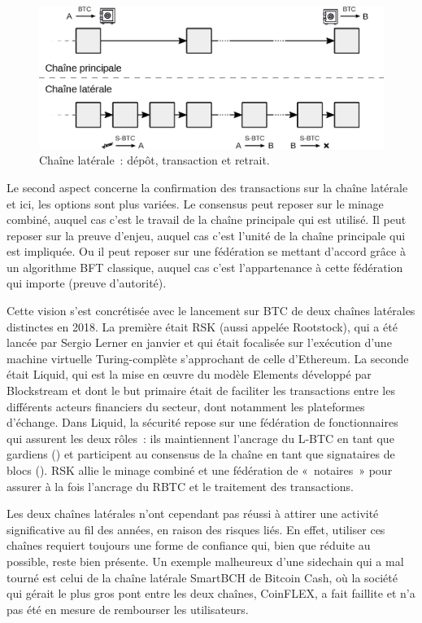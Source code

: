 \begin{figure}[ht]
  \centering
  \includegraphics[scale=0.7]{img/sidechain-two-way-peg.eps}
  \caption{Chaîne latérale~: dépôt, transaction et retrait.}
  \label{fig:sidechain-two-way-peg}
\end{figure}

Le second aspect concerne la confirmation des transactions sur la chaîne latérale et ici, les options sont plus variées. Le consensus peut reposer sur le minage combiné, auquel cas c'est le travail de la chaîne principale qui est utilisé. Il peut reposer sur la preuve d'enjeu, auquel cas c'est l'unité de la chaîne principale qui est impliquée. Ou il peut reposer sur une fédération se mettant d'accord grâce à un algorithme BFT classique, auquel cas c'est l'appartenance à cette fédération qui importe (preuve d'autorité).

Cette vision s'est concrétisée avec le lancement sur BTC de deux chaînes latérales distinctes en 2018. La première était RSK (aussi appelée Rootstock), qui a été lancée par Sergio Lerner en janvier et qui était focalisée sur l'exécution d'une machine virtuelle Turing-complète s'approchant de celle d'Ethereum. La seconde était Liquid, qui est la mise en œuvre du modèle Elements développé par Blockstream et dont le but primaire était de faciliter les transactions entre les différents acteurs financiers du secteur, dont notamment les plateformes d'échange. Dans Liquid, la sécurité repose sur une fédération de fonctionnaires qui assurent les deux rôles~: ils maintiennent l'ancrage du L-BTC en tant que gardiens () et participent au consensus de la chaîne en tant que signataires de blocs (). RSK allie le minage combiné et une fédération de «~notaires~» pour assurer à la fois l'ancrage du RBTC et le traitement des transactions.

Les deux chaînes latérales n'ont cependant pas réussi à attirer une activité significative au fil des années, en raison des risques liés. En effet, utiliser ces chaînes requiert toujours une forme de confiance qui, bien que réduite au possible, reste bien présente. Un exemple malheureux d'une sidechain qui a mal tourné est celui de la chaîne latérale SmartBCH de Bitcoin Cash, où la société qui gérait le plus gros pont entre les deux chaînes, CoinFLEX, a fait faillite et n'a pas été en mesure de rembourser les utilisateurs.

